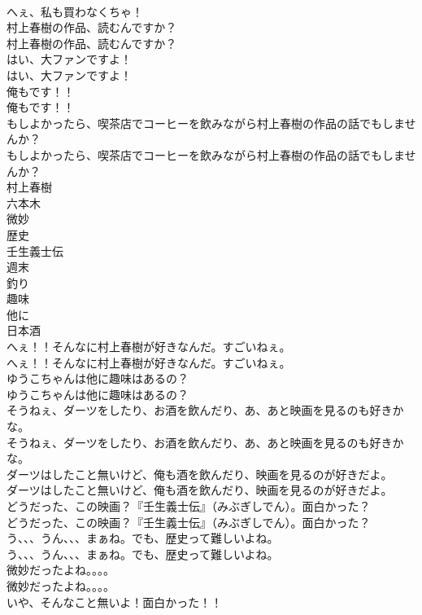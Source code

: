 \documentclass[8pt]{extreport}
\begin{document}
\begin{CJK}{UTF8}{min}
\\	へぇ、私も買わなくちゃ！ 
\\	村上春樹の作品、読むんですか？	
\\	村上春樹の作品、読むんですか？ 
\\	はい、大ファンですよ！	
\\	はい、大ファンですよ！ 
\\	俺もです！！	
\\	俺もです！！ 
\\	もしよかったら、喫茶店でコーヒーを飲みながら村上春樹の作品の話でもしませんか？	
\\	もしよかったら、喫茶店でコーヒーを飲みながら村上春樹の作品の話でもしませんか？ 
\\	村上春樹
\\	六本木
\\	微妙
\\	歴史
\\	壬生義士伝
\\	週末
\\	釣り
\\	趣味
\\	他に
\\	日本酒
\\	へぇ！！そんなに村上春樹が好きなんだ。すごいねぇ。	
\\	へぇ！！そんなに村上春樹が好きなんだ。すごいねぇ。 
\\	ゆうこちゃんは他に趣味はあるの？	
\\	ゆうこちゃんは他に趣味はあるの？ 
\\	そうねぇ、ダーツをしたり、お酒を飲んだり、あ、あと映画を見るのも好きかな。	
\\	そうねぇ、ダーツをしたり、お酒を飲んだり、あ、あと映画を見るのも好きかな。 
\\	ダーツはしたこと無いけど、俺も酒を飲んだり、映画を見るのが好きだよ。	
\\	ダーツはしたこと無いけど、俺も酒を飲んだり、映画を見るのが好きだよ。 
\\	どうだった、この映画？『壬生義士伝』（みぶぎしでん）。面白かった？	
\\	どうだった、この映画？『壬生義士伝』（みぶぎしでん）。面白かった？ 
\\	う、、、うん、、、まぁね。でも、歴史って難しいよね。	
\\	う、、、うん、、、まぁね。でも、歴史って難しいよね。 
\\	微妙だったよね。。。。	
\\	微妙だったよね。。。。 
\\	いや、そんなこと無いよ！面白かった！！	

\end{CJK}
\end{document}
